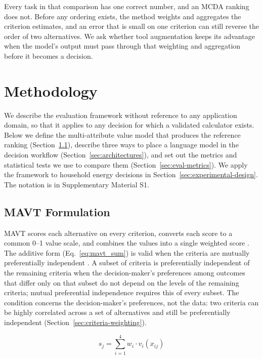\documentclass[final,3p,times]{elsarticle}
\begin{document}
Every task in that comparison has one correct number, and an MCDA ranking does not. Before any ordering exists, the method weights and aggregates the criterion estimates, and an error that is small on one criterion can still reverse the order of two alternatives. We ask whether tool augmentation keeps its advantage when the model's output must pass through that weighting and aggregation before it becomes a decision.

\section{Methodology}
\label{sec:methodology}

We describe the evaluation framework without reference to any application domain, so that it applies to any decision for which a validated calculator exists. Below we define the multi-attribute value model that produces the reference ranking (Section~\ref{sec:mavt-design}), describe three ways to place a language model in the decision workflow (Section~\ref{sec:architectures}), and set out the metrics and statistical tests we use to compare them (Section~\ref{sec:eval-metrics}). We apply the framework to household energy decisions in Section~\ref{sec:experimental-design}. The notation is in Supplementary Material S1.

\subsection{MAVT Formulation}
\label{sec:mavt-design}
MAVT scores each alternative on every criterion, converts each score to a common 0--1 value scale, and combines the values into a single weighted score \cite{keeneyraiffa1976,dyer1979}. The additive form (Eq.~\ref{eq:mavt_sum}) is valid when the criteria are mutually preferentially independent \cite{keeneyraiffa1976,dyer1979}. A subset of criteria is preferentially independent of the remaining criteria when the decision-maker's preferences among outcomes that differ only on that subset do not depend on the levels of the remaining criteria; mutual preferential independence requires this of every subset. The condition concerns the decision-maker's preferences, not the data: two criteria can be highly correlated across a set of alternatives and still be preferentially independent (Section~\ref{sec:criteria-weighting}).

\begin{equation}
\label{eq:mavt_sum}
s_j = \sum_{i=1}^{4} w_i \cdot v_i(x_{ij})
\end{equation}
\end{document}
